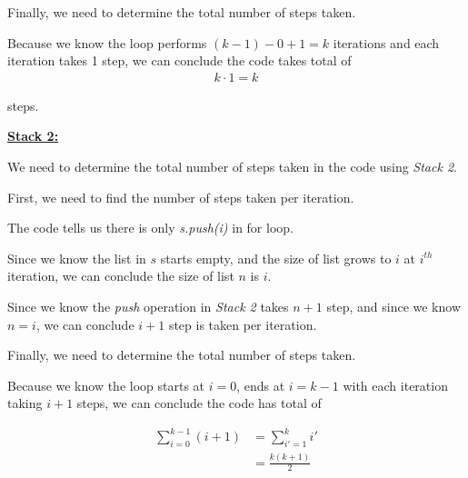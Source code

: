\documentclass[12pt]{article}
\begin{document}
\begin{enumerate}[a.]
\begin{mdframed}
        \bigskip

        Finally, we need to determine the total number of steps taken.

        \bigskip

        Because we know the loop performs $(k-1) - 0 + 1 = k$ iterations and each
        iteration takes 1 step, we can conclude the code takes total of
        \color{red}
        \setcounter{equation}{0}
        \begin{align}
            k \cdot 1 = k
        \end{align}
        \color{black}

        steps.

        \bigskip

        \underline{\textbf{Stack 2:}}

        \bigskip

        We need to determine the total number of steps taken in the code using \textit{Stack 2}.

        \bigskip

        First, we need to find the number of steps taken per iteration.

        \bigskip

        The code tells us there is only \textit{s.push(i)} in for loop.

        \bigskip

        Since we know the list in $s$ starts empty, and the size of list grows to $i$ at $i^{th}$
        iteration, we can conclude the size of list $n$ is $i$.

        \bigskip

        Since we know the \textit{push} operation in \textit{Stack 2} takes $n+1$ step,
        and since we know $n = i$, we can conclude $i+1$ step is taken per iteration.

        \bigskip

        Finally, we need to determine the total number of steps taken.

        \bigskip

        Because we know the loop starts at $i = 0$, ends at $i = k-1$ with each iteration
        taking $i+1$ steps, we can conclude the code has total of

        \setcounter{equation}{0}
        \begin{align}
            \sum\limits_{i=0}^{k-1} (i+1) &= \sum\limits_{i'=1}^k i'\\
            &= \frac{k(k+1)}{2}
        \end{align}


\end{mdframed}
\end{enumerate}
\end{document}
